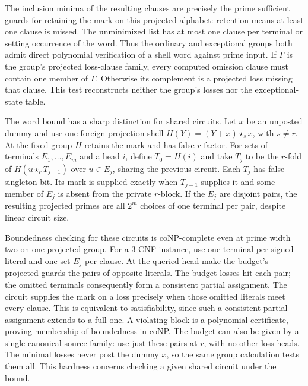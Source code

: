 The inclusion minima of the resulting clauses
are precisely the prime sufficient guards for
retaining the mark on this projected alphabet:
retention means at least one clause is missed.
The unminimized list has at most one clause per
terminal or setting occurrence of the word.
Thus the ordinary and exceptional groups both
admit direct polynomial verification of a shell
word against prime input. If $\Gamma$ is the
group's projected loss-clause family, every
computed omission clause must contain one
member of $\Gamma$. Otherwise its complement
is a projected loss missing that clause. This
test reconstructs neither the group's losses
nor the exceptional-state table.

The word bound has a sharp distinction for shared
circuits. Let $x$ be an unposted dummy and use one
foreign projection shell $H(Y)=(Y+x)\star_s x$,
with $s\ne r$. At the fixed group $H$ retains
the mark and has false $r$-factor. For sets of
terminals $E_1,\ldots,E_m$ and a head $i$, define
$T_0=H(i)$ and take $T_j$ to be the $r$-fold of
$H(u\star_r T_{j-1})$ over $u\in E_j$, sharing
the previous circuit. Each $T_j$ has false
singleton bit. Its mark is supplied exactly
when $T_{j-1}$ supplies it and some member of
$E_j$ is absent from the private $r$-block.
If the $E_j$ are disjoint pairs, the resulting
projected primes are all $2^m$ choices of one
terminal per pair, despite linear circuit size.

Boundedness checking for these circuits is
coNP-complete even at prime width two on one
projected group. For a $3$-CNF instance, use
one terminal per signed literal and one set
$E_j$ per clause. At the queried head make
the budget's projected guards the pairs of
opposite literals. The budget losses hit
each pair; the omitted terminals consequently
form a consistent partial assignment. The
circuit supplies the mark on a loss precisely
when those omitted literals meet every
clause. This is equivalent to satisfiability,
since such a consistent partial assignment
extends to a full one. A violating block is
a polynomial certificate, proving membership
of boundedness in coNP. The budget can also
be given by a single canonical source family:
use just these pairs at $r$, with no other
loss heads. The minimal losses never post the
dummy $x$, so the same group calculation tests
them all. This hardness concerns checking a
given shared circuit under the bound.


